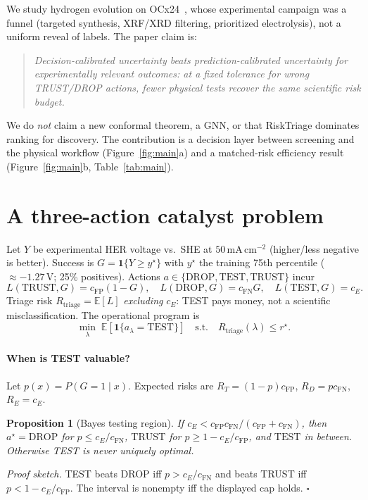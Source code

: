 \documentclass[10pt,twocolumn]{article}
\newtheorem{proposition}{Proposition}
\newcommand{\cFP}{c_{\mathrm{FP}}}
\newcommand{\cFN}{c_{\mathrm{FN}}}
\newcommand{\cE}{c_{E}}
\begin{document}
We study hydrogen evolution on OCx24~\citep{abed2024ocx24}, whose experimental campaign was a funnel (targeted synthesis, XRF/XRD filtering, prioritized electrolysis), not a uniform reveal of labels. The paper claim is:
\begin{quote}
\vspace{-0.25em}
\emph{Decision-calibrated uncertainty beats prediction-calibrated uncertainty for experimentally relevant outcomes: at a fixed tolerance for wrong TRUST/DROP actions, fewer physical tests recover the same scientific risk budget.}
\vspace{-0.25em}
\end{quote}
We do \emph{not} claim a new conformal theorem, a GNN, or that RiskTriage dominates ranking for discovery. The contribution is a decision layer between screening and the physical workflow (Figure~\ref{fig:main}a) and a matched-risk efficiency result (Figure~\ref{fig:main}b, Table~\ref{tab:main}).

\vspace{-0.4em}
\section{A three-action catalyst problem}
\vspace{-0.3em}
Let \(Y\) be experimental HER voltage vs.\ SHE at \(50\,\mathrm{mA\,cm^{-2}}\) (higher/less negative is better). Success is \(G=\mathbf{1}\{Y\ge y^\star\}\) with \(y^\star\) the training 75th percentile (\({\approx}{-}1.27\,\mathrm{V}\); 25\% positives). Actions \(a\in\{\mathrm{DROP},\mathrm{TEST},\mathrm{TRUST}\}\) incur
\[
L(\mathrm{TRUST},G)=\cFP(1-G),\quad
L(\mathrm{DROP},G)=\cFN G,\quad
L(\mathrm{TEST},G)=\cE.
\]
Triage risk \(R_{\mathrm{triage}}=\mathbb{E}[L]\) \emph{excluding} \(\cE\): TEST pays money, not a scientific misclassification. The operational program is
\begin{equation}
\min_{\lambda}\; \mathbb{E}[\mathbf{1}\{a_\lambda=\mathrm{TEST}\}]
\quad\text{s.t.}\quad
R_{\mathrm{triage}}(\lambda)\le r^\star.
\label{eq:program}
\end{equation}

\paragraph{When is TEST valuable?}
Let \(p(x)=P(G{=}1\mid x)\). Expected risks are \(R_T=(1-p)\cFP\), \(R_D=p\cFN\), \(R_E=\cE\).

\begin{proposition}[Bayes testing region]
If \(\cE < \cFP\cFN/(\cFP+\cFN)\), then
\(a^\star=\mathrm{DROP}\) for \(p\le \cE/\cFN\),
\(\mathrm{TRUST}\) for \(p\ge 1-\cE/\cFP\),
and \(\mathrm{TEST}\) in between. Otherwise TEST is never uniquely optimal.
\end{proposition}
\vspace{-0.35em}
\emph{Proof sketch.} TEST beats DROP iff \(p>\cE/\cFN\) and beats TRUST iff \(p<1-\cE/\cFP\). The interval is nonempty iff the displayed cap holds. \(\square\)
\end{document}

